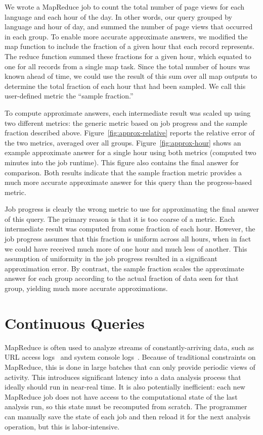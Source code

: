 We wrote a MapReduce job to count the total number of page views for each
language and each hour of the day. In other words, our query grouped by language
and hour of day, and summed the number of page views that occurred in each
group. To enable more accurate approximate answers, we modified the map function
to include the fraction of a given hour that each record represents. The reduce
function summed these fractions for a given hour, which equated to one for all
records from a single map task. Since the total number of hours was known ahead
of time, we could use the result of this sum over all map outputs to determine
the total fraction of each hour that had been sampled. We call this user-defined
metric the ``sample fraction.''

To compute approximate answers, each intermediate result was scaled up using two
different metrics: the generic metric based on job progress and the sample
fraction described above. Figure~\ref{fig:approx-relative} reports the relative
error of the two metrics, averaged over all groups. Figure~\ref{fig:approx-hour}
shows an example approximate answer for a single hour using both metrics
(computed two minutes into the job runtime). This figure also contains the final
answer for comparison. Both results indicate that the sample fraction metric provides a
much more accurate approximate answer for this query than the progress-based
metric.

Job progress is clearly the wrong metric to use for approximating the final
answer of this query. The primary reason is that it is too coarse of a
metric. Each intermediate result was computed from some fraction of each
hour. However, the job progress assumes that this fraction is uniform across all
hours, when in fact we could have received much more of one hour and much less
of another. This assumption of uniformity in the job progress resulted in a
significant approximation error. By contrast, the sample fraction scales the
approximate answer for each group according to the actual fraction of data seen for
that group, yielding much more accurate approximations.

\section{Continuous Queries}
\label{sec:continuous}

MapReduce is often used to analyze streams of constantly-arriving
data, such as URL access logs~\cite{mapreduce-osdi} and system console
logs~\cite{sosp-mining}. Because of traditional constraints on MapReduce, this 
is done in large batches that can only provide periodic views of activity.
This introduces
significant latency into a data analysis process that ideally should run in 
near-real time. It is also
potentially inefficient: each new MapReduce job does not have access
to the computational state of the last analysis run, so this state
must be recomputed from scratch. The programmer can manually save the
state of each job and then reload it for the next analysis operation,
but this is labor-intensive.


